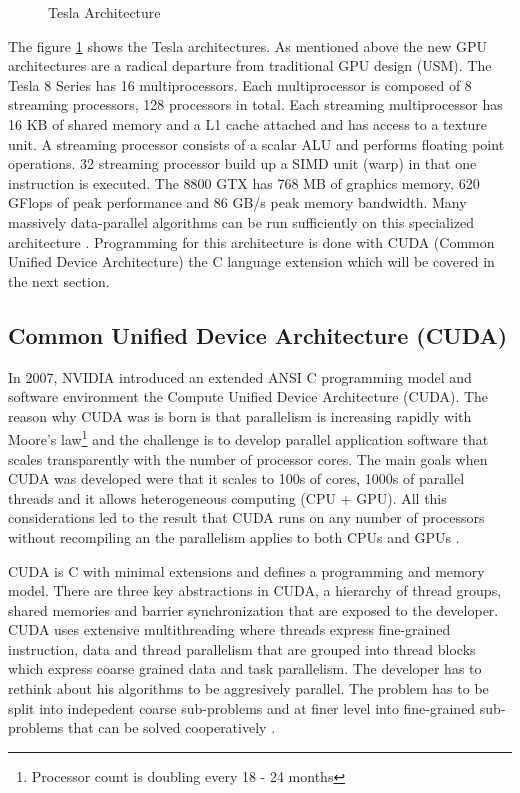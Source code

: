 \begin{figure}[ht]
\centering
\caption{Tesla Architecture}
\label{fig:tesla_architecture}
\end{figure}

The figure \ref{fig:tesla_architecture} shows the Tesla architectures. As
mentioned above the new \gls{GPU} architectures are a radical departure
from traditional \gls{GPU} design (USM). The Tesla 8 Series has 16 multiprocessors. 
Each multiprocessor is composed of 8 streaming processors, 128 processors in 
total. Each streaming multiprocessor has 16 KB of shared memory
and a L1 cache attached and has access to a texture unit. A streaming processor
consists of a scalar ALU and performs floating point operations. 32 streaming
processor build up a SIMD unit (warp) in that one instruction is executed.
The 8800 GTX has 768 MB of graphics memory, 620 GFlops of peak performance and
86 GB/s peak memory bandwidth. Many massively data-parallel algorithms can be
run sufficiently on this specialized architecture \cite{citeulike:3145468}.
Programming for this architecture is done with CUDA (Common Unified Device
Architecture) the C language extension which will be covered in the next
section.


\subsection*{Common Unified Device Architecture (CUDA)} %
\label{sub:common_unified_device_architecture_cuda_}
In 2007, NVIDIA introduced an extended ANSI C programming model and software
environment the Compute Unified Device Architecture (CUDA). The reason why CUDA
was is born is that parallelism is increasing rapidly with Moore's
law\footnote{Processor count is doubling every 18 - 24 months} and the challenge
is to develop parallel application software that scales transparently with the
number of processor cores. The main goals when CUDA was developed were that it
scales to 100s of cores, 1000s of parallel threads and it allows heterogeneous
computing (CPU + GPU). All this considerations led to the result that CUDA runs
on any number of processors without recompiling an the parallelism applies to
both CPUs and GPUs \cite{citeulike:3839013}.

CUDA is C with minimal extensions and defines a programming and memory model.
There are three key abstractions in CUDA, a hierarchy of thread groups, shared
memories and barrier synchronization \cite{citeulike:3325943} that are exposed
to the developer. CUDA uses extensive multithreading where threads express
fine-grained instruction, data and thread parallelism that are grouped into
thread blocks which express coarse grained data and task parallelism. The
developer has to rethink about his algorithms to be aggresively parallel.
The problem has to be split into indepedent coarse sub-problems and at finer
level into fine-grained sub-problems that can be solved cooperatively
\cite{citeulike:3325943}.

